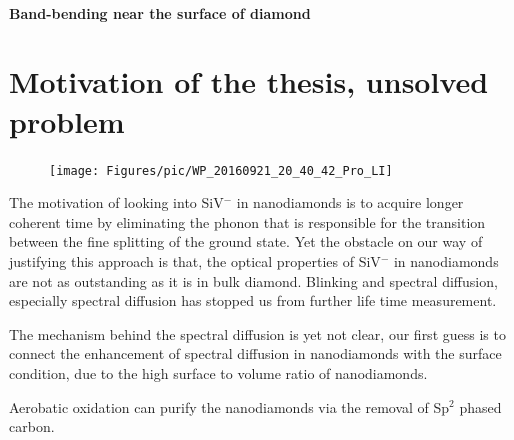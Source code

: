  
\paragraph{Band-bending near the surface of diamond}  



\section[Motivation of the thesis, unsolved problem]{Motivation of the thesis, unsolved problem}
\FloatBarrier
\begin{figure}[h]
	\centering
	\texttt{[image: Figures/pic/WP\_20160921\_20\_40\_42\_Pro\_LI]}
	\caption{}
	\label{fig:wp20160921204042proli}
\end{figure}
\FloatBarrier
The motivation of looking into SiV$^{-}$ in nanodiamonds is to acquire longer coherent time by eliminating the phonon that is responsible for the transition between the fine splitting of the ground state. Yet the obstacle on our way of justifying this approach is that, the optical properties of SiV$^{-}$ in nanodiamonds are not as outstanding as it is in bulk diamond. Blinking and spectral diffusion, especially spectral diffusion has stopped us from further life time measurement. 

The mechanism behind the spectral diffusion is yet not clear, our first guess is to connect the enhancement of spectral diffusion in nanodiamonds with the surface condition, due to the high surface to volume ratio of nanodiamonds.

Aerobatic oxidation can purify the nanodiamonds via the removal of Sp$^{2}$ phased carbon.